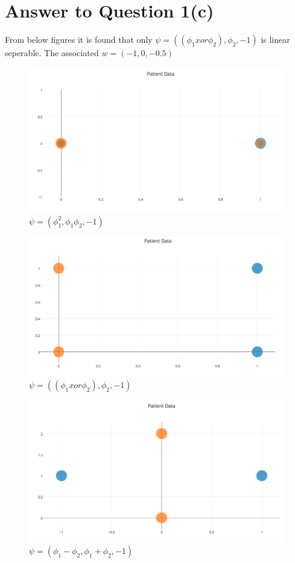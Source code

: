 \documentclass[11pt]{article}
\begin{document}
\pagebreak[4]
\section*{Answer to Question 1(c)}
From below figures it is found that only $\psi=((\phi_1 xor \phi_2),\phi_2,−1)$ is linear seperable.
The associated $w = (-1, 0, -0.5)$
\begin{figure}[h]
\center
\includegraphics[scale=0.2]{patientData1.png}
\caption{$\psi = (\phi_1^2, \phi_1\phi_2, −1)$}
\end{figure}

\begin{figure}[h]
\center
\includegraphics[scale=0.2]{patientData2.png}
\caption{$\psi=((\phi_1 xor \phi_2),\phi_2,−1)$}
\end{figure}

\begin{figure}[h]
\center
\includegraphics[scale=0.2]{patientData3.png}
\caption{$\psi=(\phi_1 - \phi_2,\phi_1 + \phi_2,−1)$}
\end{figure}
\end{document}
